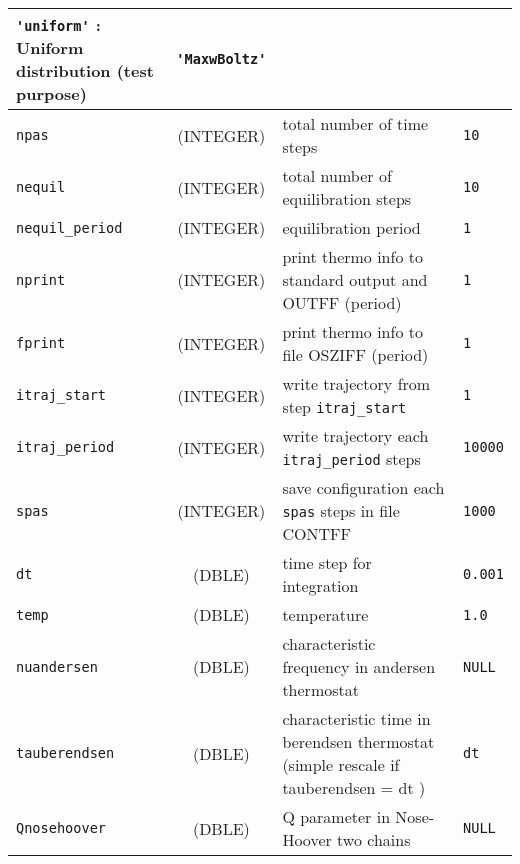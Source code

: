 \documentclass[a4paper]{article}
\begin{document}
\begin{longtable}{l|c|m{8cm}|m{2cm}}
					 \verb?'uniform'?   : Uniform distribution (test purpose) \newline                  & \verb?'MaxwBoltz'? \tabularnewline
\hline
\rule[-0.75cm]{0cm}{1.5cm}
\verb?npas?          & (INTEGER)      &  total number of time steps                                                         & \verb?10?    \\
\hline
\rule[-0.75cm]{0cm}{1.5cm}
\verb?nequil?        & (INTEGER)      &  total number of equilibration steps                                                & \verb?10? \\
\hline
\rule[-0.75cm]{0cm}{1.5cm}
\verb?nequil_period? & (INTEGER)      &  equilibration period                                                               & \verb?1? \\
\hline
\rule[-0.75cm]{0cm}{1.5cm}
\verb?nprint?        & (INTEGER)      &  print thermo info to standard output and OUTFF (period)                            & \verb?1? \\
\hline
\rule[-0.75cm]{0cm}{1.5cm}
\verb?fprint?        & (INTEGER)      &  print thermo info to file OSZIFF (period)                                          & \verb?1? \\
\hline
\rule[-0.75cm]{0cm}{1.5cm}
\verb?itraj_start?   & (INTEGER)      &  write trajectory from step \verb?itraj_start?                                      & \verb?1? \\
\hline
\rule[-0.75cm]{0cm}{1.5cm}
\verb?itraj_period?  & (INTEGER)      &  write trajectory each \verb?itraj_period? steps                                    & \verb?10000? \\
\hline
\rule[-0.75cm]{0cm}{1.5cm}
\verb?spas?          & (INTEGER)      &  save configuration each \verb?spas? steps in file CONTFF                           & \verb?1000? \\
\hline
\rule[-0.75cm]{0cm}{1.5cm}
\verb?dt?            & (DBLE)         &  time step for integration                                                          & \verb?0.001? \\
\hline
\rule[-0.75cm]{0cm}{1.5cm}
\verb?temp?          & (DBLE)         &  temperature                                                                        & \verb?1.0?\\
\hline
\rule[-0.75cm]{0cm}{1.5cm}
\verb?nuandersen?    & (DBLE)         &  characteristic frequency in andersen thermostat                                    & \verb?NULL? \\
\hline
\rule[-0.75cm]{0cm}{1.5cm}
\verb?tauberendsen?  & (DBLE)         &  characteristic time in berendsen thermostat (simple rescale if tauberendsen = dt ) & \verb?dt? \\
\hline
\rule[-0.75cm]{0cm}{1.5cm}
\verb?Qnosehoover?   & (DBLE)         &  Q parameter in Nose-Hoover two chains                                              & \verb?NULL? \\
\hline
\hline
\end{longtable}
\end{document}
